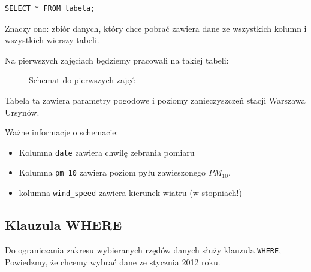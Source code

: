 \documentclass[a4paper]{article}
\begin{document}
\begin{verbatim}
SELECT * FROM tabela;
\end{verbatim}


Znaczy ono: zbiór danych, który chce pobrać zawiera dane
ze wszystkich kolumn i wszystkich wierszy tabeli.

Na pierwszych zajęciach będziemy pracowali na takiej tabeli:

\begin{figure}
\noindent{}
\caption{Schemat do pierwszych zajęć}
\end{figure}

Tabela ta zawiera parametry pogodowe i poziomy zanieczyszczeń
stacji Warszawa Ursynów.

Ważne informacje o schemacie:
%
\begin{itemize}

\item Kolumna \texttt{date} zawiera chwilę zebrania pomiaru

\item Kolumna \texttt{pm\_10} zawiera poziom pyłu zawieszonego $PM_{10}$.

\item kolumna \texttt{wind\_speed} zawiera kierunek wiatru (w stopniach!)

\end{itemize}


\subsection{Klauzula WHERE%
  \label{klauzula-where}%
}

Do ograniczania zakresu wybieranych rzędów danych służy klauzula \texttt{WHERE},
Powiedzmy, że chcemy wybrać dane ze stycznia 2012 roku.
\end{document}
